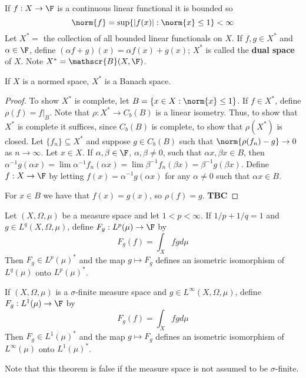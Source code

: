 If $f:X\rightarrow \F$ is a continuous linear functional it is bounded so $$\norm{f} = \sup\{|f(x)|:\norm{x}\leq 1\} < \infty$$
Let $X^* = $ the collection of all bounded linear functionals on $X$. If $f,g \in X^*$ and $\alpha \in \F$, define $(\alpha f+g)(x) = \alpha f(x)+g(x)$; $X^*$ is called the \textbf{dual space} of $X$. Note $X^* = \mathscr{B}(X,\F)$.

\begin{prop}
    If $X$ is a normed space, $X^*$ is a Banach space.
\end{prop}
\begin{proof}
    To show $X^*$ is complete, let $B = \{x \in X:\norm{x} \leq 1\}$. If $f \in X^*$, define $\rho(f) = f\vert_B$. Note that $\rho:X^*\rightarrow C_b(B)$ is a linear isometry. Thus, to show that $X^*$ is complete it suffices, since $C_b(B)$ is complete, to show that $\rho(X^*)$ is closed. Let $\{f_n\} \subseteq X^*$ and suppose $g \in C_b(B)$ such that $\norm{\rho(f_n) - g}\rightarrow 0$ as $n\rightarrow \infty$. Let $x \in X$. If $\alpha,\beta \in \F$, $\alpha,\beta \neq 0$, such that $\alpha x,\beta x \in B$, then $\alpha^{-1}g(\alpha x) = \lim \alpha^{-1}f_n(\alpha x) = \lim \beta^{-1}f_n(\beta x) = \beta^{-1}g(\beta x)$. Define $f:X\rightarrow \F$ by letting $f(x) = \alpha^{-1}g(\alpha x)$ for any $\alpha \neq 0$ such that $\alpha x \in B$.

    For $x \in B$ we have that $f(x) = g(x)$, so $\rho(f) = g$. \textbf{TBC}
\end{proof}

\begin{thm}
    Let $(X,\Omega,\mu)$ be a measure space and let $1 < p < \infty$. If $1/p+1/q = 1$ and $g \in L^q(X,\Omega,\mu)$, define $F_g:L^p(\mu)\rightarrow \F$ by $$F_g(f) = \int_X fgd\mu$$
    Then $F_g \in L^p(\mu)^*$ and the map $g\mapsto F_g$ defines an isometric isomorphism of $L^q(\mu)$ onto $L^p(\mu)^*$.
\end{thm}


\begin{thm}
    If $(X,\Omega,\mu)$ is a $\sigma$-finite measure space and $g \in L^{\infty}(X,\Omega,\mu)$, define $F_g:L^1(\mu)\rightarrow \F$ by $$F_g(f) = \int_Xfg d\mu$$
    Then $F_g \in L^1(\mu)^*$ and the map $g \mapsto F_g$ defines an isometric isomorphism of $L^{\infty}(\mu)$ onto $L^1(\mu)^*$.
\end{thm}

Note that this theorem is false if the measure space is not assumed to be $\sigma$-finite.

